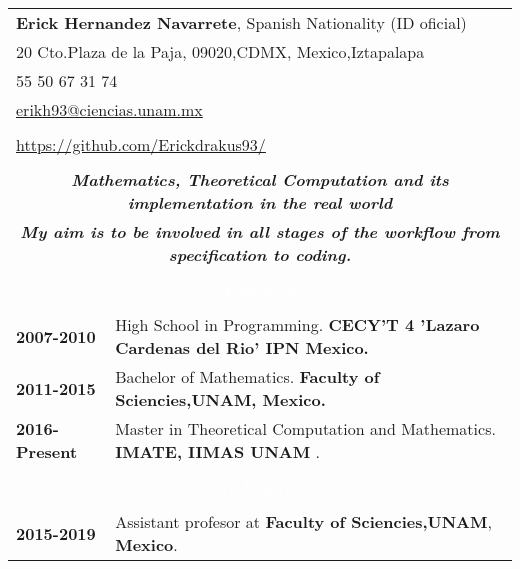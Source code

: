 \documentclass[twoside,a4paper,openright,10pt]{report}
\begin{document}
\begin{table}[ht]
\centering
\begin{tabular}{p{40mm} p{140mm}}

\multicolumn{2}{l}{\textbf{Erick Hernandez Navarrete}, Spanish Nationality (ID oficial)}\\
\multicolumn{2}{l}{20 Cto.Plaza de la Paja, 09020,CDMX, Mexico,Iztapalapa}\\
\multicolumn{2}{l}{55 50 67 31 74}\\
\multicolumn{2}{l}{\url{erikh93@ciencias.unam.mx}}\\ \\
\multicolumn{2}{l}{\url{https://github.com/Erickdrakus93/}}\\\\
\multicolumn{2}{c}{\textbf{\textit{\large Mathematics, Theoretical Computation and its implementation in the real world}}}\\
\multicolumn{2}{c}{\textbf{\textit{\large My aim is to be involved in all stages of the workflow from specification to coding.}}}\\ \\

\multicolumn{2}{c}{\cellcolor{black} \textcolor{white}{Education}}\\ \\

 \textbf{2007-2010} & High School in Programming. 
\textbf{CECY'T 4 'Lazaro Cardenas del Rio' IPN Mexico.}\\
 \textbf{2011-2015} & Bachelor of Mathematics. \textbf{ Faculty of Sciencies,UNAM, Mexico.}\\
 \textbf{2016-Present}& Master in Theoretical Computation and Mathematics. 
 \textbf{ IMATE, IIMAS UNAM} .\\
\\

\multicolumn{2}{c}{\cellcolor{black} \textcolor{white}{Work Experience}}\\ \\

\textbf{2015-2019} & Assistant profesor at \textbf{Faculty of Sciencies,UNAM}, \textbf{Mexico}.\\


\end{tabular}
\end{table}
\end{document}
